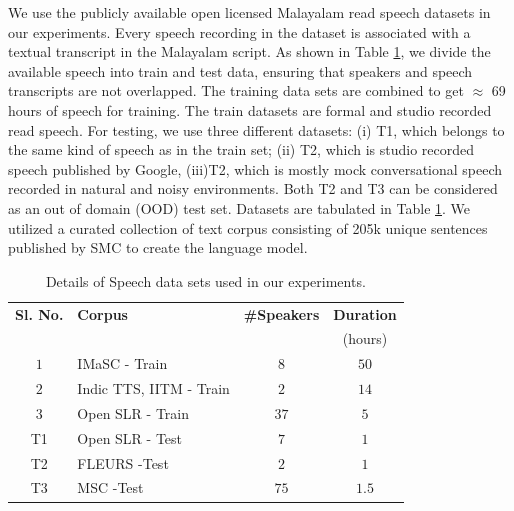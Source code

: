 \documentclass[runningheads]{llncs}
\begin{document}
We use the publicly available open licensed Malayalam read speech datasets \cite{baby2016resources,he-etal-2020-open} in our experiments. Every speech recording in the dataset is associated with a textual transcript in the Malayalam script. As shown in Table \ref{tab:speechdatasets}, we divide the available speech into train and test data, ensuring that speakers and speech transcripts are not overlapped. The training data sets are combined to get $\approx$ 69 hours of speech for training. The train datasets are formal and studio recorded read speech. For testing, we use three different datasets: (i) T1, which belongs to the same kind of speech as in the train set; (ii) T2, which is studio recorded speech published by Google, (iii)T2, which is mostly mock conversational speech recorded in natural and noisy environments. Both T2 and T3 can be considered as an out of domain (OOD) test set. Datasets are tabulated in Table \ref{tab:speechdatasets}. We utilized a curated collection of text corpus consisting of 205k unique sentences published by SMC \cite{smctext} to create the language model. 


\begin{table}[htpb]
	\caption{Details of Speech data sets used in our experiments. }
	\label{tab:speechdatasets}
	\centering
	\begin{tabular}{|c|l|c|c|}
		\hline \hline
		\textbf{Sl. No.} & \textbf{Corpus}                                     & \textbf{\#Speakers} & \textbf{Duration} \\
		              &                                                     &                                           & (hours)         \\
		\hline
    		$1$             & IMaSC  \cite{gopinath2022imasc} - Train & $8$                                  & $50$    \\
		$2$             & Indic TTS, IITM \cite{baby2016resources}- Train     & $2$                                    & $14$               \\
		$3$             & Open SLR  \cite{he-etal-2020-open} - Train & $37$                                  & $5$             
           \\\hline
		T1            & Open SLR  \cite{he-etal-2020-open} - Test  & $7$                                   & $1$                \\
   	T2&FLEURS \cite{fleurs2022arxiv}   -Test                                                  &$2$                       & $1$  \\
		 T3&MSC \cite{smcspeech}   -Test                             & $75$                                             & $1.5$                    \\

\hline
	\end{tabular}

\end{table}
\end{document}
